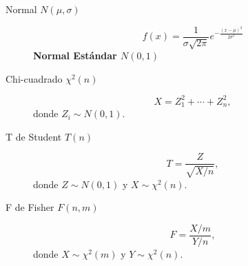 \begin{multicols*}{2}
\begin{tcolorbox}[hbox, title=Continuas]
\begin{minipage}{0.4\textwidth}
\begin{description}
\item[Normal $N(\mu,\sigma)$]
      \[f(x)= \frac{1}{\sigma\sqrt{2\pi}}e^{-\frac{(x-\mu)^2}{2\sigma^2}}\]
      \textbf{Normal Estándar $N(0,1)$}
\item[Chi-cuadrado $\chi^2(n)$]
      \[X = Z_1^2+\cdots +Z_n^2,\]
      donde $Z_i\sim N(0,1)$.
\item[T de Student $T(n)$]
      \[T = \frac{Z}{\sqrt{X/n}},\]
      donde $Z\sim N(0,1)$ y $X\sim \chi^2(n)$.
\item[F de Fisher $F(n,m)$]
      \[F = \frac{X/m}{Y/n},\]
      donde $X\sim \chi^2(m)$ y $Y\sim \chi^2(n)$.
\end{description}
\end{minipage}
\end{tcolorbox}

\end{multicols*}